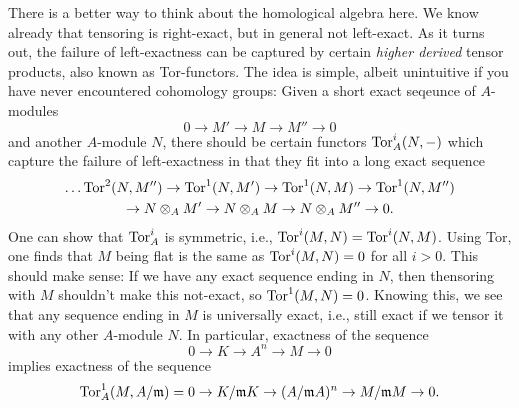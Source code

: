 \documentclass[a4paper,11pt]{article}
\begin{document}
There is a better way to think about the homological algebra here. We know
already that tensoring is right-exact, but in general not left-exact. As it
turns out, the failure of left-exactness can be captured by certain
\textit{higher derived} tensor products, also known as Tor-functors. The idea
is simple, albeit unintuitive if you have never encountered cohomology groups:
Given a short exact seqeunce of $A$-modules
\begin{equation*}
    0 \to M' \to M \to M'' \to 0
\end{equation*}
and another $A$-module $N$, there should be certain functors $\operatorname{Tor}^i_A(N,-)$
which capture the failure of left-exactness in that they fit into a long exact
sequence
\begin{multline*}
    \dots \operatorname{Tor}^2(N, M'') \to \operatorname{Tor}^1(N,M') \to \operatorname{Tor}^1(N,M) \to \operatorname{Tor}^1(N,M'') \\ 
    \to N \otimes_A M' \to N \otimes_A M \to N \otimes_A M'' \to 0.
\end{multline*}
One can show that $\operatorname{Tor}^i_A$ is symmetric, i.e., $\operatorname{Tor}^i(M,N) = \operatorname{Tor}^i(N,M)$. 
Using Tor, one finds that $M$ being flat is the same as $\operatorname{Tor}^i(M, N) = 0$
for all $i > 0$. This should make sense: If we have any exact sequence 
ending in $N$, then thensoring with $M$ shouldn't make this not-exact, so 
$\operatorname{Tor}^1(M,N) = 0$. Knowing this, we see that any sequence ending in $M$ is
universally exact, i.e., still exact if we tensor it with any other $A$-module 
$N$. In particular, exactness of the sequence
\begin{equation*}
    0 \to K \to A^n \to M \to 0
\end{equation*}
implies exactness of the sequence
\begin{equation*}
    \operatorname{Tor}^1_A(M, A/\mathfrak{m}) = 0 \to K/ \mathfrak{m} K \to (A/\mathfrak{m} A)^n \to M/\mathfrak{m} M \to 0.
\end{equation*}



\contactend
\end{document}
